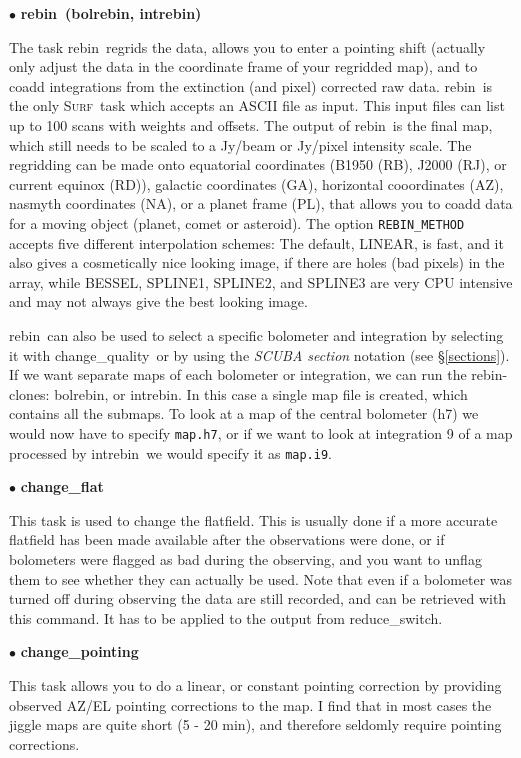 \documentclass[twoside,11pt]{article}
\newcommand{\surf}{\xref{\textsc{Surf}}{sun216}{}}
\newcommand{\task}[1]{\textsf{#1}}
\newcommand{\param}[1]{\texttt{#1}}
\newcommand{\rebin}{\xref{\task{rebin}}{sun216}{REBIN}}
\newcommand{\bolrebin}{\xref{\task{bolrebin}}{sun216}{BOLREBIN}}
\newcommand{\intrebin}{\xref{\task{intrebin}}{sun216}{INTREBIN}}
\newcommand{\chgqual}{\xref{\task{change\_\-qua\-lity}}{sun216}{CHANGE_QUALITY}}
\newcommand{\chgflat}{\xref{\task{change\_flat}}{sun216}{CHANGE_FLAT}}
\newcommand{\chgpnt}{\xref{\task{change\_pointing}}{sun216}{CHANGE_POINTING}}
\newcommand{\resw}{\xref{\task{reduce\_switch}}{sun216}{REDUCE_SWITCH}}
\newcommand{\xref}[3]{#1}
\begin{document}
$\bullet$ \textbf{\rebin\ (\bolrebin, \intrebin)}

The task \rebin\ regrids the data, allows you to enter a pointing shift
(actually only adjust the data in the coordinate frame of your
regridded map), and to coadd integrations from the extinction (and
pixel) corrected raw data. \rebin\ is the only \surf\ task which
accepts an ASCII file as input. This input files can list up to 100
scans with weights and offsets. The output of \rebin\ is the final map,
which still needs to be scaled to a Jy/beam or Jy/pixel intensity
scale.  The regridding can be made onto equatorial coordinates (B1950
(RB), J2000 (RJ), or current equinox (RD)), galactic coordinates (GA),
horizontal cooordinates (AZ), nasmyth coordinates (NA), or a planet
frame (PL), that allows you to coadd data for a moving object (planet,
comet or asteroid). The option \param{REBIN\_METHOD} accepts five
different interpolation schemes: The default, LINEAR, is fast, and it
also gives a cosmetically nice looking image, if there are holes (bad
pixels) in the array, while BESSEL, SPLINE1, SPLINE2, and SPLINE3 are
very CPU intensive and may not always give the best looking image.

\rebin\ can also be used to select a specific bolometer and integration
by selecting it with \chgqual\ or by using the \textit{SCUBA section}
notation (see \S\ref{sections}). If we want separate maps of each
bolometer or integration, we can run the \rebin-clones: \bolrebin, or
\intrebin. In this case a single map file is created, which contains
all the submaps. To look at a map of the central bolometer (h7) we
would now have to specify \texttt{map.h7}, or if we want to look at
integration 9 of a map processed by \intrebin\ we would specify it as
\texttt{map.i9}.

$\bullet$ \textbf{\chgflat}

This task is used to change the flatfield. This is usually done if
a more accurate flatfield has been made available after the observations
were done, or if bolometers were flagged as bad during the observing, and
you want to unflag them to see whether they can actually be used. Note
that even if a bolometer was turned off during observing the data are
still recorded, and can be retrieved with this command. It has to be applied
to the output from \resw. 

$\bullet$ \textbf{\chgpnt}

This task allows you to do a linear, or constant pointing
correction by providing observed AZ/EL pointing corrections to the map.
I find that in most cases the jiggle maps are quite short (5 - 20 min),
and therefore seldomly require pointing corrections.
\end{document}
